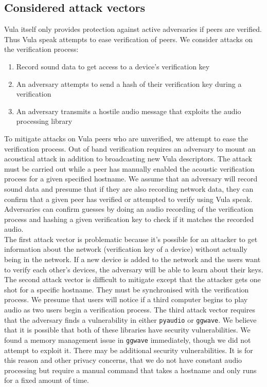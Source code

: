 \documentclass[a4paper,11pt]{report}
\begin{document}
\subsection{Considered attack vectors}
Vula itself only provides protection against active adversaries if peers are verified. Thus Vula speak attempts to ease verification of peers. We consider attacks on the verification process:
\begin{enumerate}
  \item Record sound data to get access to a device's verification key
  \item An adversary attempts to send a hash of their verification key during a verification
  \item An adversary transmits a hostile audio message that exploits the audio processing library
\end{enumerate}
To mitigate attacks on Vula peers who are unverified, we attempt to ease the verification process. Out of band verification requires an adversary to mount an acoustical attack in addition to broadcasting new Vula descriptors. The attack must be carried out while a peer has manually enabled the acoustic verification process for a given specified hostname.
We assume that an adversary will record sound data and presume that if they are also recording network data, they can confirm that a given peer has verified or attempted to verify using Vula speak. Adversaries can confirm guesses by doing an audio recording of the verification process and hashing a given verification key to check if it matches the recorded audio.
\\[4mm]
The first attack vector is problematic because it's possible for an attacker to get information about the network (verification key of a device) without actually being in the network. If a new device is added to the network and the users want to verify each other's devices, the adversary will be able to learn about their keys.
\\[4mm]
The second attack vector is difficult to mitigate except that the attacker gets one shot for a specific hostname. They must be synchronised with the verification process. We presume that users will notice if a third computer begins to play audio as two users begin a verification process.
The third attack vector requires that the adversary finds a vulnerability in either \texttt{pyaudio} or \texttt{ggwave}. We believe that it is possible that both of these libraries have security vulnerabilities. We found a memory management issue in \texttt{ggwave} immediately, though we did not attempt to exploit it. There may be additional security vulnerabilities. It is for this reason and other privacy concerns, that we do not have constant audio processing but require a manual command that takes a hostname and only runs for a fixed amount of time.
\end{document}
